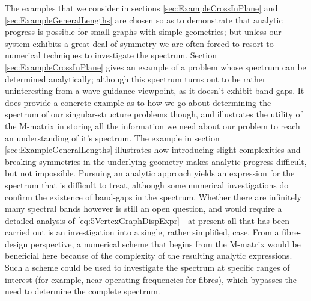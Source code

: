 The examples that we consider in sections \ref{sec:ExampleCrossInPlane} and \ref{sec:ExampleGeneralLengths} are chosen so as to demonstrate that analytic progress is possible for small graphs with simple geometries; but unless our system exhibits a great deal of symmetry we are often forced to resort to numerical techniques to investigate the spectrum.
Section \ref{sec:ExampleCrossInPlane} gives an example of a problem whose spectrum can be determined analytically; although this spectrum turns out to be rather uninteresting from a wave-guidance viewpoint, as it doesn't exhibit band-gaps.
It does provide a concrete example as to how we go about determining the spectrum of our singular-structure problems though, and illustrates the utility of the M-matrix in storing all the information we need about our problem to reach an understanding of it's spectrum.
The example in section \ref{sec:ExampleGeneralLengths} illustrates how introducing slight complexities and breaking symmetries in the underlying geometry makes analytic progress difficult, but not impossible.
Pursuing an analytic approach yields an expression for the spectrum that is difficult to treat, although some numerical investigations do confirm the existence of band-gaps in the spectrum.
Whether there are infinitely many spectral bands however is still an open question, and would require a detailed analysis of \eqref{eq:5VertexGraphDispExpr} - at present all that has been carried out is an investigation into a single, rather simplified, case.
From a fibre-design perspective, a numerical scheme that begins from the M-matrix would be beneficial here because of the complexity of the resulting analytic expressions.
Such a scheme could be used to investigate the spectrum at specific ranges of interest (for example, near operating frequencies for fibres), which bypasses the need to determine the complete spectrum. \newline

